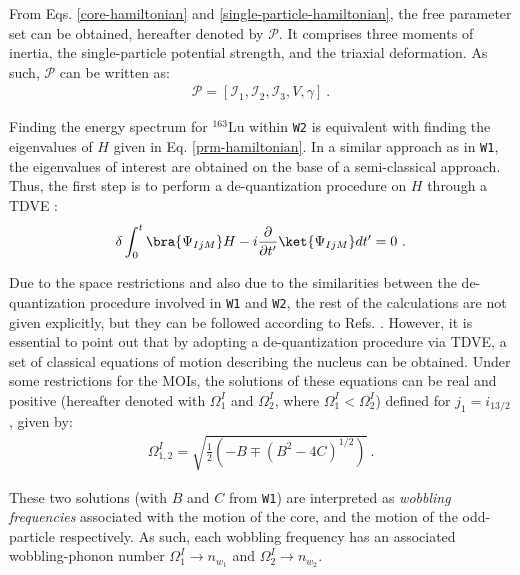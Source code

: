 \documentclass[myclassdoc,debug]{rjparticle}
\begin{document}
From Eqs. \ref{core-hamiltonian} and \ref{single-particle-hamiltonian}, the free parameter set can be obtained, hereafter denoted by $\mathcal{P}$. It comprises three moments of inertia, the single-particle potential strength, and the triaxial deformation. As such, $\mathcal{P}$ can be written as:
\begin{align}
    \mathcal{P}=\left[\mathcal{I}_1,\mathcal{I}_2,\mathcal{I}_3,V,\gamma\right]\ .
    \label{parameter-set}
\end{align}

Finding the energy spectrum for $^{163}$Lu within \texttt{W2} is equivalent with finding the eigenvalues of $H$ given in Eq. \ref{prm-hamiltonian}. In a similar approach as in \texttt{W1}, the eigenvalues of interest are obtained on the base of a semi-classical approach. Thus, the first step is to perform a de-quantization procedure on $H$ through a TDVE \cite{raduta2007semiclassical,budaca2018tilted,raduta2017semiclassical,raduta2020new}:
\begin{align}
    \delta\int_0^t\bra{\Psi_{IjM}}H-i\frac{\partial}{\partial t'}\ket{\Psi_{IjM}}dt'=0\ .
    \label{tdve}
\end{align}

Due to the space restrictions and also due to the similarities between the de-quantization procedure involved in \texttt{W1} and \texttt{W2}, the rest of the calculations are not given explicitly, but they can be followed according to Refs. \cite{raduta2018wobbling,raduta2020approach,raduta2020towards}. However, it is essential to point out that by adopting a de-quantization procedure via TDVE, a set of classical equations of motion describing the nucleus can be obtained. Under some restrictions for the MOIs, the solutions of these equations can be real and positive (hereafter denoted with $\Omega_1^I$ and $\Omega_2^I$, where $\Omega_1^I<\Omega_2^I$) defined for $j_1=i_{13/2}$, given by:
\begin{align}
    \Omega_{1,2}^I=\sqrt{\frac{1}{2}\left(-B\mp(B^2-4C)^{1/2}\right)}\ .
    \label{wobbling-frequencies}
\end{align}

These two solutions (with $B$ and $C$ from \texttt{W1}) are interpreted as \emph{wobbling frequencies} associated with the motion of the core, and the motion of the odd-particle respectively. As such, each wobbling frequency has an associated wobbling-phonon number $\Omega_1^I \to n_{w_1}$ and $\Omega_2^I \to n_{w_2}$.
\end{document}
